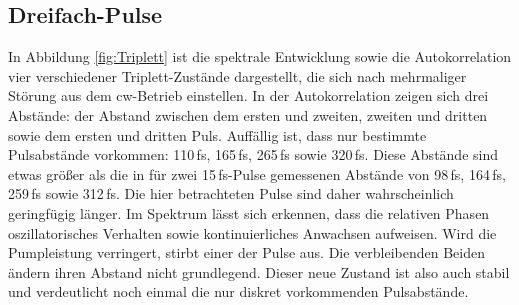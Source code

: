 \documentclass[bachelor,       %
               twoside,        %
               BCOR10mm,       %
               liststotoc,nomtotoc,bibtotoc, %
               english,ngerman, %
               final,          %
               ]{GAUBM}
\begin{document}
\clearpage

\subsection{Dreifach-Pulse}
In Abbildung \ref{fig:Triplett} ist die spektrale Entwicklung sowie die Autokorrelation vier verschiedener Triplett-Zustände dargestellt, die sich nach mehrmaliger Störung aus dem cw-Betrieb einstellen.
In der Autokorrelation zeigen sich drei Abstände: der Abstand zwischen dem ersten und zweiten, zweiten und dritten sowie dem ersten und dritten Puls.
Auffällig ist, dass nur bestimmte Pulsabstände vorkommen: 110\,fs, 165\,fs, 265\,fs sowie 320\,fs.
Diese Abstände sind etwas größer als die in \cite{kitano_stable_1998} für zwei 15\,fs-Pulse gemessenen Abstände von 98\,fs, 164\,fs, 259\,fs sowie 312\,fs.
Die hier betrachteten Pulse sind daher wahrscheinlich geringfügig länger.
Im Spektrum lässt sich erkennen, dass die relativen Phasen oszillatorisches Verhalten sowie kontinuierliches Anwachsen aufweisen.
Wird die Pumpleistung verringert, stirbt einer der Pulse aus.
Die verbleibenden Beiden ändern ihren Abstand nicht grundlegend.
Dieser neue Zustand ist also auch stabil und verdeutlicht noch einmal die nur diskret vorkommenden Pulsabstände.
\end{document}
